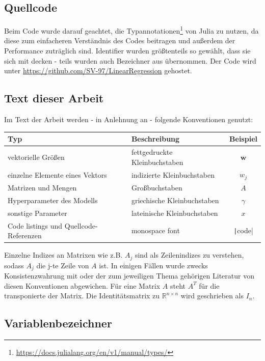 \documentclass{article}
\theoremstyle{plain} %
\theoremstyle{definition} %
\begin{document}
\subsection{Quellcode}
Beim Code wurde darauf geachtet, die Typannotationen\footnote{\url{https://docs.julialang.org/en/v1/manual/types/}} von Julia zu nutzen, da diese zum einfacheren Verständnis des Codes beitragen und außerdem der Performance zuträglich sind.
Identifier wurden größtenteils so gewählt, dass sie sich mit \cite{Bishop} decken - teils wurden auch Bezeichner aus \cite{Lippe} übernommen. Der Code wird unter \url{https://github.com/SV-97/LinearRegression} gehostet.

\subsection{Text dieser Arbeit}
Im Text der Arbeit werden - in Anlehnung an \cite{Bishop} - folgende Konventionen genutzt:

\begin{tabular}{llc}
  \toprule
  Typ & Beschreibung & Beispiel \\
  \midrule
  vektorielle Größen & fettgedruckte Kleinbuchstaben & $\mathbf{w}$ \\
  einzelne Elemente eines Vektors & indizierte Kleinbuchstaben & $w_j$ \\
  Matrizen und Mengen & Großbuchstaben & $A$ \\
  Hyperparameter des Modells & griechische Kleinbuchstaben & $\gamma$ \\
  sonstige Parameter & lateinische Kleinbuchstaben & $x$ \\
  Code listings und Quellcode-Referenzen & monospace font & \texttt|code| \\
\end{tabular}

Einzelne Indizes an Matrixen wie z.B. $A_j$ sind als Zeilenindizes zu verstehen, sodass $A_j$ die j-te Zeile von $A$ ist.
In einigen Fällen wurde zwecks Konsistenzwahrung mit \cite{Bishop} oder der zum jeweiligen Thema gehörigen Literatur von diesen Konventionen abgewichen.
Für eine Matrix $A$ steht $A^T$ für die transponierte der Matrix. Die Identitätsmatrix zu $\mathbb{R}^{n \times n}$ wird geschrieben als $I_n$.

\subsection{Variablenbezeichner}
\end{document}
